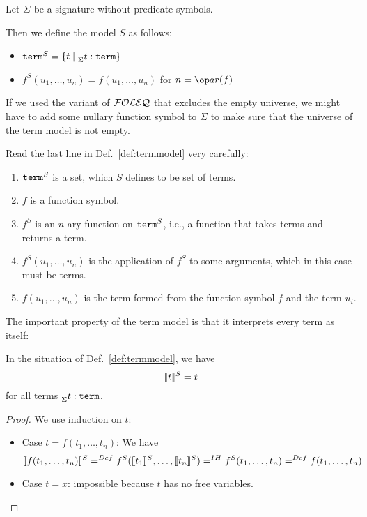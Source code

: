\begin{definition}\label{def:termmodel}
Let $\Sigma$ be a signature without predicate symbols.

Then we define the model $S$ as follows:
 \begin{itemize}
  \item $\mathtt{term}^S=\{t\;|\;^{}_{\Sigma}t:\mathtt{term}\}$
  \item $f^S(u_1,\ldots,u_n)=f(u_1,\ldots,u_n)$ for $n=\arit(f)$
 \end{itemize}
\end{definition}

\begin{remark}
If we used the variant of ${\mathcal{FOLEQ}}$ that excludes the empty universe, we might have to add some nullary function symbol to $\Sigma$ to make sure that the universe of the term model is not empty.
\end{remark}

Read the last line in Def.~\ref{def:termmodel} very carefully:
\begin{enumerate}
 \item $\mathtt{term}^S$ is a set, which $S$ defines to be set of terms.
 \item $f$ is a function symbol.
 \item $f^S$ is an $n$-ary function on $\mathtt{term}^S$, i.e., a function that takes terms and returns a term.
 \item $f^S(u_1,\ldots,u_n)$ is the application of $f^S$ to some arguments, which in this case must be terms.
 \item $f(u_1,\ldots,u_n)$ is the term formed from the function symbol $f$ and the term $u_i$.
\end{enumerate}

The important property of the term model is that it interprets every term as itself:
\begin{lemma}\label{thm:termmodel}
In the situation of Def.~\ref{def:termmodel}, we have
  \[\llbracket t\rrbracket^{S}=t\]
for all terms $^{}_{\Sigma}t:\mathtt{term}$.
\end{lemma}
\begin{proof}
We use induction on $t$:
\begin{itemize}
  \item Case $t=f(t_1,\ldots,t_n)$: We have
   \[\llbracket f(t_1,\ldots,t_n)\rrbracket^{S}=^{Def}f^S(\llbracket t_1\rrbracket^{S},\ldots,\llbracket t_n\rrbracket^{S})=^{IH}f^S(t_1,\ldots,t_n)=^{Def}f(t_1,\ldots,t_n)\]
  \item Case $t=x$: impossible because $t$ has no free variables.
\end{itemize}
\end{proof}

